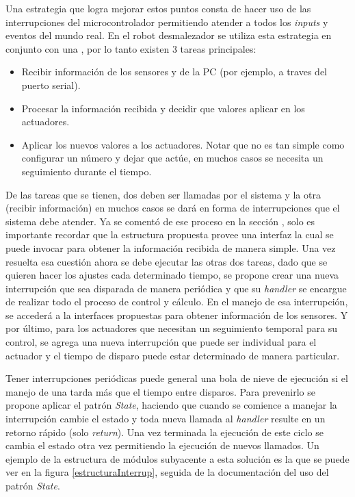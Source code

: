 Una estrategia que logra mejorar estos puntos consta de hacer uso de las interrupciones del microcontrolador permitiendo atender a todos los \textit{inputs} y eventos del mundo real. En el robot desmalezador \cite{paperPomponio} se utiliza esta estrategia en conjunto con una , por lo tanto existen 3 tareas principales:

\begin{itemize}
    \item Recibir información de los sensores y de la PC (por ejemplo, a traves del puerto serial).
    \item Procesar la información recibida y decidir que valores aplicar en los actuadores.
    \item Aplicar los nuevos valores a los actuadores. Notar que no es tan simple como configurar un número y dejar que actúe, en muchos casos se necesita un seguimiento durante el tiempo.
\end{itemize}

De las tareas que se tienen, dos deben ser llamadas por el sistema y la otra (recibir información) en muchos casos se dará en forma de interrupciones que el sistema debe atender. Ya se comentó de ese proceso en la sección , solo es importante recordar que la estructura propuesta provee una interfaz la cual se puede invocar para obtener la información recibida de manera simple. Una vez resuelta esa cuestión ahora se debe ejecutar las otras dos tareas, dado que se quieren hacer los ajustes cada determinado tiempo, se propone crear una nueva interrupción que sea disparada de manera periódica y que su \textit{handler} se encargue de realizar todo el proceso de control y cálculo. En el manejo de esa interrupción, se accederá a la interfaces propuestas para obtener información de los sensores. Y por último, para los actuadores que necesitan un seguimiento temporal para su control, se agrega una nueva interrupción que puede ser individual para el actuador y el tiempo de disparo puede estar determinado de manera particular.

Tener interrupciones periódicas puede general una bola de nieve de ejecución si el manejo de una tarda más que el tiempo entre disparos. Para prevenirlo se propone aplicar el patrón \textit{State}, haciendo que cuando se comience a manejar la interrupción cambie el estado y toda nueva llamada al \textit{handler} resulte en un retorno rápido (solo \textit{return}). Una vez terminada la ejecución de este ciclo se cambia el estado otra vez permitiendo la ejecución de nuevos llamados. Un ejemplo de la estructura de módulos subyacente a esta solución es la que se puede ver en la figura \ref{estructuraInterrup}, seguida de la documentación del uso del patrón \textit{State}.

